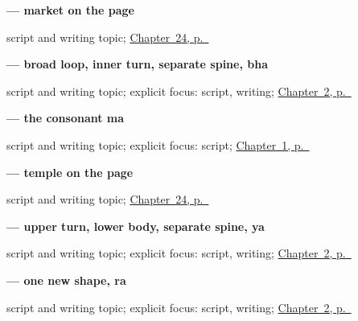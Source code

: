 \noindent\begin{minipage}[t]{\linewidth}
\raggedright
\textbf{ — market on the page}\par
\footnotesize script and writing topic; \hyperref[ch:gu-first-three-places]{Chapter~24, p.~\pageref*{ch:gu-first-three-places}}
\end{minipage}\par\smallskip

\noindent\begin{minipage}[t]{\linewidth}
\raggedright
\textbf{ — broad loop, inner turn, separate spine, bha}\par
\footnotesize script and writing topic; explicit focus: script, writing; \hyperref[ch:greetings]{Chapter~2, p.~\pageref*{ch:greetings}}
\end{minipage}\par\smallskip

\noindent\begin{minipage}[t]{\linewidth}
\raggedright
\textbf{ — the consonant ma}\par
\footnotesize script and writing topic; explicit focus: script; \hyperref[ch:first-greeting-script]{Chapter~1, p.~\pageref*{ch:first-greeting-script}}
\end{minipage}\par\smallskip

\noindent\begin{minipage}[t]{\linewidth}
\raggedright
\textbf{ — temple on the page}\par
\footnotesize script and writing topic; \hyperref[ch:gu-first-three-places]{Chapter~24, p.~\pageref*{ch:gu-first-three-places}}
\end{minipage}\par\smallskip

\noindent\begin{minipage}[t]{\linewidth}
\raggedright
\textbf{ — upper turn, lower body, separate spine, ya}\par
\footnotesize script and writing topic; explicit focus: script, writing; \hyperref[ch:greetings]{Chapter~2, p.~\pageref*{ch:greetings}}
\end{minipage}\par\smallskip

\noindent\begin{minipage}[t]{\linewidth}
\raggedright
\textbf{ — one new shape, ra}\par
\footnotesize script and writing topic; explicit focus: script, writing; \hyperref[ch:greetings]{Chapter~2, p.~\pageref*{ch:greetings}}
\end{minipage}\par\smallskip

